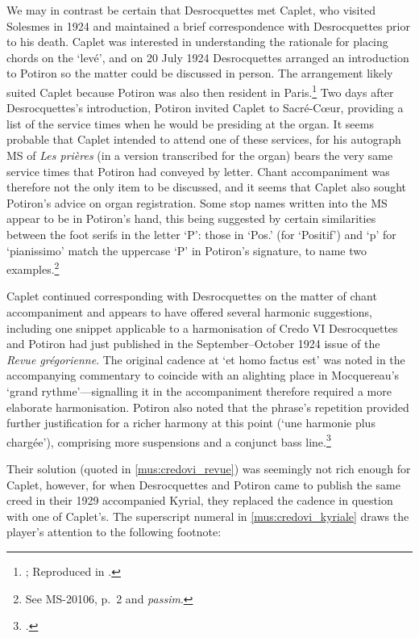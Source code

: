 We may in contrast be certain that Desrocquettes met Caplet, who visited Solesmes in 1924 and maintained a brief correspondence with Desrocquettes prior to his death.
Caplet was interested in understanding the rationale for placing chords on the `levé', and on 20 July 1924 Desrocquettes arranged an introduction to Potiron so the matter could be discussed in person.
The arrangement likely suited Caplet because Potiron was also then resident in Paris.\footnote{; Reproduced in \cite[104--105]{HalaSolesmesmusiciensannees2020}.}
Two days after Desrocquettes's introduction, Potiron invited Caplet to Sacré-Cœur, providing a list of the service times when he would be presiding at the organ.
It seems probable that Caplet intended to attend one of these services, for his autograph MS of \emph{Les prières} (in a version transcribed for the organ) bears the very same service times that Potiron had conveyed by letter.
Chant accompaniment was therefore not the only item to be discussed, and it seems that Caplet also sought Potiron's advice on organ registration.
Some stop names written into the MS appear to be in Potiron's hand, this being suggested by certain similarities between the foot serifs in the letter `P': those in `Pos.' (for `Positif') and `p' for `pianissimo' match the uppercase `P' in Potiron's signature, to name two examples.\footnote{See \bnf{} MS-20106, p.~2 and \emph{passim}.}%

Caplet continued corresponding with Desrocquettes on the matter of chant accompaniment and appears to have offered several harmonic suggestions, including one snippet applicable to a harmonisation of Credo VI Desrocquettes and Potiron had just published in the September--October 1924 issue of the \emph{Revue grégorienne}.
The original cadence at `et homo factus est' was noted in the accompanying commentary to coincide with an alighting place in Mocquereau's `grand rythme'---signalling it in the accompaniment therefore required a more elaborate harmonisation.
Potiron also noted that the phrase's repetition provided further justification for a richer harmony at this point (`une harmonie plus chargée'), comprising more suspensions and a conjunct bass line.\footcite[pp. 189, 194]{GajardCredoVI1925}

Their solution (quoted in \cref{mus:credovi_revue}) was seemingly not rich enough for Caplet, however, for when Desrocquettes and Potiron came to publish the same creed in their 1929 \mbox{accompanied} Kyrial, they replaced the cadence in question with one of Caplet's.
The superscript numeral in \cref{mus:credovi_kyriale} draws the player's attention to the following footnote:
\pagebreak{}

